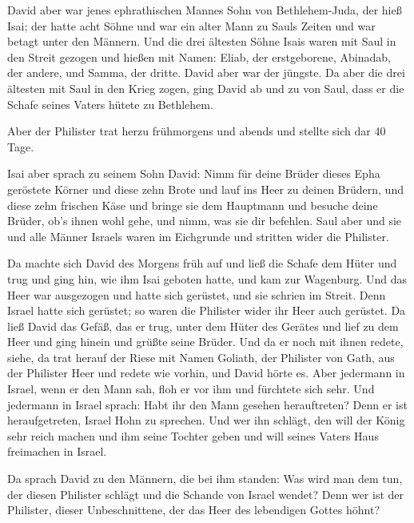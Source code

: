 David aber war jenes ephrathischen Mannes Sohn von
Bethlehem-Juda, der hieß Isai; der hatte acht Söhne und war ein alter
Mann zu Sauls Zeiten und war betagt unter den Männern. 
Und die drei ältesten Söhne Isais waren mit Saul in den Streit gezogen
und hießen mit Namen: Eliab, der erstgeborene, Abinadab, der andere, und
Samma, der dritte.  David aber war der jüngste. Da aber
die drei ältesten mit Saul in den Krieg zogen,  ging
David ab und zu von Saul, dass er die Schafe seines Vaters hütete zu
Bethlehem.

 Aber der Philister trat herzu frühmorgens und abends und
stellte sich dar 40 Tage.

 Isai aber sprach zu seinem Sohn David: Nimm für deine
Brüder dieses Epha geröstete Körner und diese zehn Brote und lauf ins
Heer zu deinen Brüdern,  und diese zehn frischen Käse und
bringe sie dem Hauptmann und besuche deine Brüder, ob's ihnen wohl gehe,
und nimm, was sie dir befehlen.  Saul aber und sie und
alle Männer Israels waren im Eichgrunde und stritten wider die
Philister.

 Da machte sich David des Morgens früh auf und ließ die
Schafe dem Hüter und trug und ging hin, wie ihm Isai geboten hatte, und
kam zur Wagenburg. Und das Heer war ausgezogen und hatte sich gerüstet,
und sie schrien im Streit.  Denn Israel hatte sich
gerüstet; so waren die Philister wider ihr Heer auch gerüstet.
 Da ließ David das Gefäß, das er trug, unter dem Hüter
des Gerätes und lief zu dem Heer und ging hinein und grüßte seine
Brüder.  Und da er noch mit ihnen redete, siehe, da trat
herauf der Riese mit Namen Goliath, der Philister von Gath, aus der
Philister Heer und redete wie vorhin, und David hörte es.
 Aber jedermann in Israel, wenn er den Mann sah, floh er
vor ihm und fürchtete sich sehr.  Und jedermann in Israel
sprach: Habt ihr den Mann gesehen herauftreten? Denn er ist
heraufgetreten, Israel Hohn zu sprechen. Und wer ihn schlägt, den will
der König sehr reich machen und ihm seine Tochter geben und will seines
Vaters Haus freimachen in Israel.

 Da sprach David zu den Männern, die bei ihm standen: Was
wird man dem tun, der diesen Philister schlägt und die Schande von
Israel wendet? Denn wer ist der Philister, dieser Unbeschnittene, der
das Heer des lebendigen Gottes höhnt?

